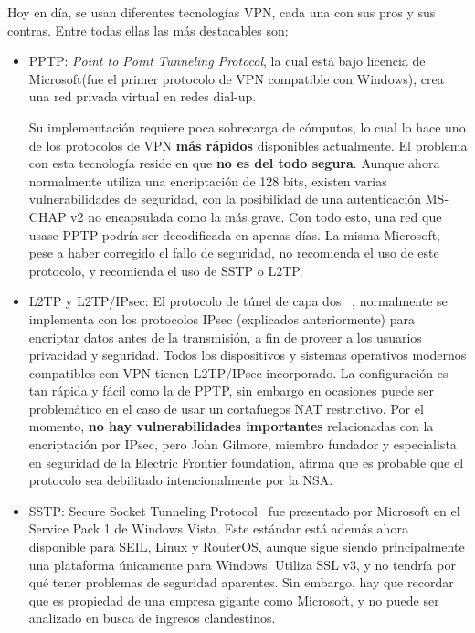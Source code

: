  Hoy en día, se usan diferentes tecnologías VPN, cada una con sus pros y sus contras. Entre todas ellas las más destacables son:
 
 \begin{itemize}
 	\item PPTP: \textit{Point to Point Tunneling Protocol}, la cual está bajo licencia de Microsoft(fue el primer protocolo de VPN compatible con Windows), crea una red privada virtual en redes dial-up. ~\cite{article:pptp}
 	
 	Su implementación requiere poca sobrecarga de cómputos, lo cual lo hace uno de los protocolos de VPN \textbf{más rápidos} disponibles actualmente.
 	El problema con esta tecnología reside en que \textbf{no es del todo segura}. Aunque ahora normalmente utiliza una encriptación de 128 bits, existen varias vulnerabilidades de seguridad, con la posibilidad de una autenticación MS-CHAP v2 no encapsulada como la más grave. Con todo esto, una red que usase PPTP podría ser decodificada en apenas días.
 	La misma Microsoft, pese a haber corregido el fallo de seguridad, no recomienda el uso de este protocolo, y recomienda el uso de SSTP o L2TP.
 	
 	\item L2TP y L2TP/IPsec: El protocolo de túnel de capa dos ~\cite{article:pptp}, normalmente se implementa con los protocolos IPsec (explicados anteriormente) para encriptar datos antes de la transmisión, a fin de proveer a los usuarios privacidad y seguridad. Todos los dispositivos y sistemas operativos modernos compatibles con VPN tienen L2TP/IPsec incorporado. La configuración es tan rápida y fácil como la de PPTP, sin embargo en ocasiones puede ser problemático en el caso de usar un cortafuegos NAT restrictivo.
 	Por el momento, \textbf{no hay vulnerabilidades importantes }relacionadas con la encriptación por IPsec, pero John Gilmore,  miembro fundador y especialista en seguridad de la Electric Frontier foundation, afirma que es probable que el protocolo sea debilitado intencionalmente por la NSA.
 	
 	\item SSTP: Secure Socket Tunneling Protocol~\cite{article:sstp} fue presentado por Microsoft en el Service Pack 1 de Windows Vista. Este estándar está además ahora disponible para SEIL, Linux y RouterOS, aunque sigue siendo principalmente una plataforma únicamente para Windows. 
 	Utiliza SSL v3, y no tendría por qué tener problemas de seguridad aparentes. Sin embargo, hay que recordar que es propiedad de una empresa gigante como Microsoft, y no puede ser analizado en busca de ingresos clandestinos.
 	

\end{itemize}
